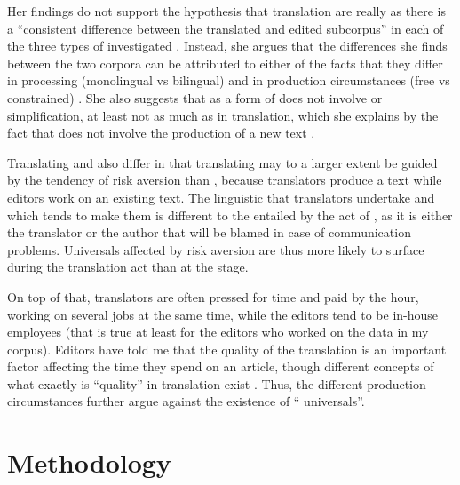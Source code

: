 \documentclass[output=paper]{LSP/langsci}
\begin{document}
Her findings do not support the hypothesis that translation  are really   as there is a \enquote{consistent difference between the translated and edited subcorpus} in each of the three types of  investigated \parencite[380]{kruger12}. Instead, she argues that the differences she finds between the two corpora can be attributed to either of the facts that they differ in processing (monolingual vs bilingual) and in production circumstances (free vs constrained) \parencite[381]{kruger12}. She also suggests that  as a form of  does not involve  or simplification, at least not as much as in translation, which she explains by the fact that  does not involve the production of a new text \parencite*[382]{kruger12}.

Translating and  also differ in that translating may to a larger extent be guided by the tendency of risk aversion \parencites{pym05}{pym08} than , because translators produce a text while editors work on an existing text. The linguistic  that translators undertake and which tends to make them  is different to the  entailed by the act of , as it is either the translator or the author that will be blamed in case of communication problems. Universals affected by risk aversion are thus more likely to surface during the translation act than at the  stage.

On top of that, translators are often pressed for time and paid by the hour, working on several jobs at the same time, while the editors tend to be in-house employees (that is true at least for the editors who worked on the data in my corpus). Editors have told me that the quality of the translation is an important factor affecting the time they spend on an article, though different concepts of what exactly is \enquote{quality} in translation exist \parencites{drugan13}{mossop14}{house15tq}. Thus, the different production circumstances further argue against the existence of \enquote{ universals}.

\section{Methodology}\label{bisiada:sec:meth}
\end{document}
